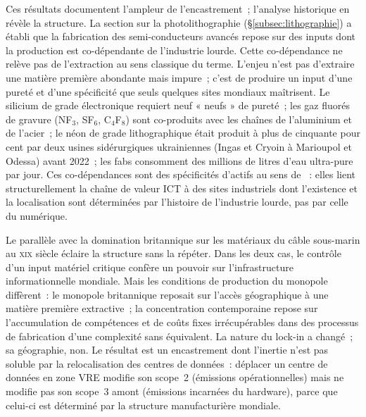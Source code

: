 Ces résultats documentent l'ampleur de l'encastrement~; l'analyse historique en révèle la structure. La section sur la photolithographie (§\ref{subsec:lithographie}) a établi que la fabrication des semi-conducteurs avancés repose sur des inputs dont la production est co-dépendante de l'industrie lourde. Cette co-dépendance ne relève pas de l'extraction au sens classique du terme. L'enjeu n'est pas d'extraire une matière première abondante mais impure~; c'est de produire un input d'une pureté et d'une spécificité que seuls quelques sites mondiaux maîtrisent. Le silicium de grade électronique requiert neuf « neufs » de pureté~; les gaz fluorés de gravure (NF$_3$, SF$_6$, C$_4$F$_8$) sont co-produits avec les chaînes de l'aluminium et de l'acier~; le néon de grade lithographique était produit à plus de cinquante pour cent par deux usines sidérurgiques ukrainiennes (Ingas et Cryoin à Marioupol et Odessa) avant 2022~; les fabs consomment des millions de litres d'eau ultra-pure par jour. Ces co-dépendances sont des spécificités d'actifs au sens de \textcite{williamson_economic_1985}~: elles lient structurellement la chaîne de valeur ICT à des sites industriels dont l'existence et la localisation sont déterminées par l'histoire de l'industrie lourde, pas par celle du numérique.

Le parallèle avec la domination britannique sur les matériaux du câble sous-marin au \textsc{xix}\ieme{} siècle éclaire la structure sans la répéter. Dans les deux cas, le contrôle d'un input matériel critique confère un pouvoir sur l'infrastructure informationnelle mondiale. Mais les conditions de production du monopole diffèrent~: le monopole britannique reposait sur l'accès géographique à une matière première extractive~; la concentration contemporaine repose sur l'accumulation de compétences et de coûts fixes irrécupérables dans des processus de fabrication d'une complexité sans équivalent. La nature du lock-in a changé~; sa géographie, non. Le résultat est un encastrement dont l'inertie n'est pas soluble par la relocalisation des centres de données~: déplacer un centre de données en zone VRE modifie son scope~2 (émissions opérationnelles) mais ne modifie pas son scope~3 amont (émissions incarnées du hardware), parce que celui-ci est déterminé par la structure manufacturière mondiale.

